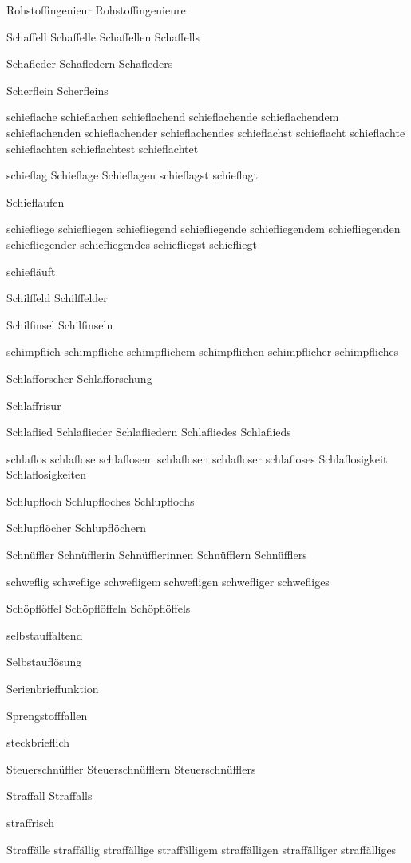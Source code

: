 Rohstoffingenieur Rohstoffingenieure

Schaffell Schaffelle Schaffellen Schaffells

Schafleder Schafledern Schafleders

Scherflein Scherfleins

schieflache schieflachen schieflachend schieflachende schieflachendem schieflachenden schieflachender schieflachendes schieflachst schieflacht schieflachte schieflachten schieflachtest schieflachtet

schieflag Schieflage Schieflagen schieflagst schieflagt

Schieflaufen

schiefliege schiefliegen schiefliegend schiefliegende schiefliegendem schiefliegenden schiefliegender schiefliegendes schiefliegst schiefliegt

schiefläuft

Schilffeld Schilffelder %

Schilfinsel Schilfinseln

schimpflich schimpfliche schimpflichem schimpflichen schimpflicher schimpfliches

Schlafforscher Schlafforschung

Schlaffrisur 

Schlaflied Schlaflieder Schlafliedern Schlafliedes Schlaflieds

schlaflos schlaflose schlaflosem schlaflosen schlafloser schlafloses Schlaflosigkeit Schlaflosigkeiten

Schlupfloch Schlupfloches Schlupflochs

Schlupflöcher Schlupflöchern

Schnüffler Schnüfflerin Schnüfflerinnen Schnüfflern Schnüfflers

schweflig schweflige schwefligem schwefligen schwefliger schwefliges

Schöpflöffel Schöpflöffeln Schöpflöffels

selbstauffaltend

Selbstauflösung

Serienbrieffunktion

Sprengstofffallen

steckbrieflich

Steuerschnüffler Steuerschnüfflern Steuerschnüfflers

Straffall Straffalls

straffrisch

Straffälle straffällig straffällige straffälligem straffälligen straffälliger straffälliges

